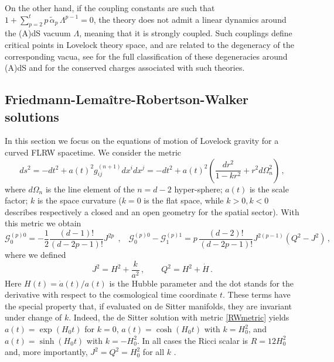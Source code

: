 \documentclass[aps,prd,preprint,nofootinbib]{revtex4-1}
\begin{document}
On the other hand, if the coupling constants are such that $1 + \sum_{p=2}^t p \,  \tilde{\alpha}_p \, \Lambda^{p-1} = 0$, the theory does not admit a linear dynamics around the (A)dS vacuum $\Lambda$, meaning that it is strongly coupled. Such couplings define critical points in Lovelock theory space, and are related to the degeneracy of the corresponding vacua, see \cite{DALLG} for the full classification of these degeneracies around (A)dS and \cite{TekinCrit,LUV} for the conserved charges associated with such theories.

\subsection{Friedmann-Lema\^{i}tre-Robertson-Walker solutions}\label{sec:FLRW}

In this section we focus on the equations of motion of Lovelock gravity for a curved FLRW spacetime. We consider the metric
\begin{equation}\label{RWmetric}
ds^2 = - dt^2 + a(t)^2 g^{(n+1)}_{ij} dx^i dx^j = - dt^2 + a(t)^2 \left(\frac{dr^2}{1-kr^2} + r^2 d\Omega_n^2\right)\,,
\end{equation}
where $d\Omega_n$ is the line element of the $n=d-2$ hyper-sphere; $a(t)$ is the scale factor; $k$ is the space curvature ($k=0$ is the flat space, while $k>0,k<0$ describes respectively a closed and an open geometry for the spatial sector).
With this metric we obtain 
\begin{equation}
 \mathcal{G}_{0}^{(p)0}=-\frac{1}{2} \frac{(d-1)!}{(d-2p-1)!} J^{2p} \,\; , \;\;\;  \mathcal{G}_{0}^{(p)0}-  \mathcal{G}_{1}^{(p)1} = p  \, \frac{(d-2)!}{(d-2p-1)!} J^{2(p-1)} \left( Q^2 - J^2 \right)  \, ,
\end{equation} 
where we defined 
\begin{equation}
    J^2 = H^2 + \frac{k}{a^2}\,,\qquad Q^2=H^2+\dot{H}\,.
\end{equation}
Here $H(t) = \dot{a}(t)/a(t)$ is the Hubble parameter and the dot stands for the derivative with respect to the cosmological time coordinate $t$. These terms have the special property that, if evaluated on de Sitter manifolds, they are invariant under change of $k$. Indeed, the de Sitter solution with metric \eqref{RWmetric} yields $a(t)=\exp(H_0t)$ for $k=0$, $a(t)=\cosh(H_0t)$ with $k=H_0^2$, and $a(t)=\sinh(H_0t)$ with $k=-H_0^2$. In all cases the Ricci scalar is $R=12H_0^2$ and, more importantly, $J^2=Q^2=H_0^2$ for all $k$ \cite{DiCriscienzo:2009hd,Acquaviva:2011vq}.
\end{document}

